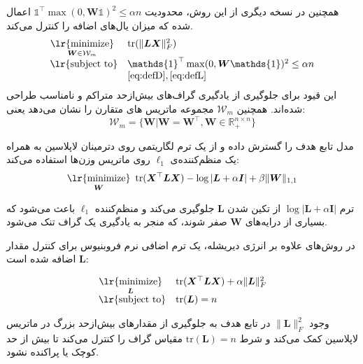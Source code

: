 \documentclass[10pt,twocolumn,a4paper]{article}
\newcommand\minimize[1]{\mathop{\text{\lr{minimize}}}\limits_{#1}\ }
\begin{document}
     همچنین در نسخه دیگری از این روش، محدودیت \( \mathds{1}^\top \max(0, \bm{W} \mathds{1})^2 \leq \alpha n \) اعمال شده که میزان یال‌های اضافه را کنترل می‌کند. 
      \begin{equation}
     	\begin{array}{cl}
     		\minimize{\bm{W}\in\mathcal{W}_m} & \text{tr}(\|\bm{L} \bm{X}\|^2_F) \\
     		\text{\lr{subject to}} & \mathds{1}^\top \max(0, \bm{W} \mathds{1})^2 \leq \alpha n  \\
     		& \eqref{eq:defD}, \eqref{eq:defL}
     	\end{array}
     \end{equation}
     این قیود برای جلوگیری از یادگیری گراف‌های بیش‌ازحد متراکم و نامناسب طراحی شده‌اند. همچنین 
     $\mathcal{W}_m$
     مجموعه ماتریس های متقارن را نشان می‌دهد یعنی:
     \begin{equation}
     	  \mathcal{W}_m = \big\{\bm{W} | \bm{W} = \bm{W}^\top, \bm{W} \in \mathds{R}_+^{n\times n}\big\}
     \end{equation}
     
     مدل \cite{Lake2010DiscoveringSB} تابع هدف را گسترش داده و از یک ترم لگاریتمی روی دترمینان لاپلاسین به همراه یک منظم‌کننده‌ی \( \ell_1 \) روی ماتریس وزن‌ها استفاده می‌کند:
     \begin{equation}
     	     \minimize{\bm{W}} \text{tr} (\bm{X}^\top \bm{L} \bm{X}) - \log | \bm{L} + \alpha \bm{I} | + \beta \| \bm{W} \|_{1,1}
     \end{equation}
     
     ترم \( \log | \bm{L} + \alpha \bm{I} | \) از تکین شدن \( \bm{L} \) جلوگیری می‌کند و منظم‌کننده \( \ell_1 \) باعث می‌شود که بسیاری از درایه‌های \( \bm{W} \) صفر شوند، که منجر به یادگیری یک گراف تنک می‌شود.
     
     در روش‌های
     \cite{Hu2015,Dong2016}
      علاوه بر انرژی دیریشله، یک ترم اضافی نرم فروبنیوس برای کنترل مقدار \( \bm{L} \) اضافه شده است:
     
     \begin{equation}
 		\begin{array}{cl}
    	     \minimize{\bm{L}} & \text{tr} (\bm{X}^\top \bm{L} \bm{X}) + \alpha \|\bm{L}\|_F^2 \\
 			\text{\lr{subject to}} & \text{tr}(\bm{L}) = n
 		\end{array}
     \end{equation}
     
     وجود \( \|\bm{L}\|_F^2 \) در تابع هدف به جلوگیری از مقدارهای بیش‌ازحد بزرگ در ماتریس لاپلاسین کمک می‌کند و شرط \( \text{tr}(\bm{L}) = n \) مقیاس گراف را کنترل می‌کند تا بیش از حد کوچک یا پراکنده نشود.
     
\end{document}
